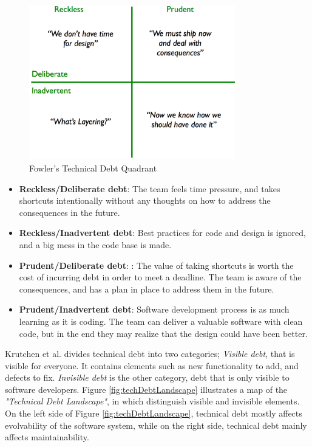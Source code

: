 \begin{figure}[ht!]
	\centering
	\includegraphics[width=0.8\textwidth]{images/techDebtQuadrant.png}
	\caption{Fowler's Technical Debt Quadrant}
	\label{fig:techDebtQuad}
\end{figure}

\begin{itemize}
	\item \textbf{Reckless/Deliberate debt}: The team feels time pressure, and takes shortcuts intentionally without any thoughts on how to address the consequences in the future.
	\item \textbf{Reckless/Inadvertent debt}: Best practices for code and design is ignored, and a big mess in the code base is made.
	\item \textbf{Prudent/Deliberate debt}: : The value of taking shortcuts is worth the cost of incurring debt in order to meet a deadline. The team is aware of the consequences, and has a plan in place to address them in the future. 
	\item \textbf{Prudent/Inadvertent debt}: Software development process is as much learning as it is coding. The team can deliver a valuable software with clean code, but in the end they may realize that the design could have been better.
\end{itemize}

Krutchen et al.\cite{krutchen} divides technical debt into two categories; \textit{Visible debt}, that is visible for everyone. It contains elements such as new functionality to add, and defects to fix. \textit{Invisible debt} is the other category, debt that is only visible to software developers. Figure \ref{fig:techDebtLandscape} illustrates a map of the \textit{"Technical Debt Landscape"}, in which distinguish visible and invisible elements. On the left side of Figure \ref{fig:techDebtLandscape}, technical debt mostly affects evolvability of the software system, while on the right side, technical debt mainly affects maintainability.

